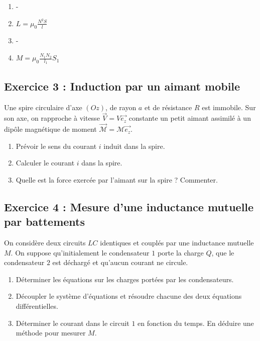 \begin{enumerate}
	\item -
	\item $L = \mu_0 \frac{N^2 S}{l}$
	\item -
	\item $M = \mu_0 \frac{N_1 N_2}{l_1}S_1$
\end{enumerate}

\subsection{Exercice 3 : Induction par un aimant mobile}

Une spire circulaire d'axe $(Oz)$, de rayon $a$ et de résistance $R$ est immobile. Sur son axe, on rapproche à vitesse $\vec{V} = V \vec{e_z}$ constante un petit aimant assimilé à un dipôle magnétique de moment $\vec{\mathcal{M}} = \mathcal{M}\vec{e_z}$.

\begin{enumerate}
	\item Prévoir le sens du courant $i$ induit dans la spire.
	\item Calculer le courant $i$ dans la spire.
	\item Quelle est la force exercée par l'aimant sur la spire ? Commenter.
\end{enumerate}

\subsection{Exercice 4 : Mesure d'une inductance mutuelle par battements}

On considère deux circuits $LC$ identiques et couplés par une inductance mutuelle $M$. On suppose qu'initialement le condensateur $1$ porte la charge $Q$, que le condensateur $2$ est déchargé et qu'aucun courant ne circule.

\begin{enumerate}
	\item Déterminer les équations sur les charges portées par les condensateurs.
	\item Découpler le système d'équations et résoudre chacune des deux équations différentielles.
	\item Déterminer le courant dans le circuit $1$ en fonction du temps. En déduire une méthode pour mesurer $M$.
\end{enumerate}